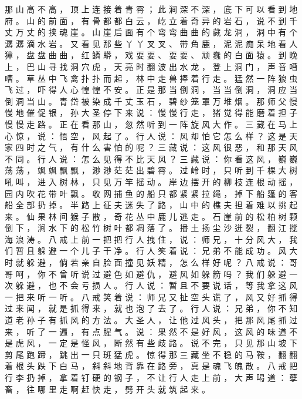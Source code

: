 {那 山 高 不 高 ， 顶 上 连 接 着 青 霄 ； 此 涧 深 不 深 ， 底 下 可 以 看 到 地 府 。
山 的 前 面 ， 有 骨 都 都 白 云 ， 屹 立 着 奇 异 的 岩 石 ， 说 不 到 千 丈 万 丈 的 挟 魂 崖 。
山 崖 后 面 有 个 弯 弯 曲 曲 的 藏 龙 洞 ， 洞 中 有 个 潺 潺 滴 水 岩 。
又 看 见 那 些 丫 丫 叉 叉 、 带 角 鹿 ， 泥 泥 痴 呆 地 看 人 獐 ， 盘 盘 曲 曲 ， 红 鳞 蟒 ， 戏 耍 耍 、 耍 耍 、 顽 蠢 的 白 面 猿 。
到 晚 上 ， 巴 山 寻 找 洞 穴 虎 ， 天 亮 时 翻 波 出 水 龙 ， 登 上 洞 门 ， 声 音 嘈 嘈 。
草 丛 中 飞 禽 扑 扑 而 起 ， 林 中 走 兽 捧 着 行 走 。
猛 然 一 阵 狼 虫 飞 过 ， 吓 得 人 心 惶 惶 不 安 。
正 是 那 当 倒 洞 ， 当 当 倒 洞 ， 洞 应 当 倒 洞 当 山 。
青 岱 被 染 成 千 丈 玉 石 ， 碧 纱 笼 罩 万 堆 烟 。
那 师 父 慢 慢 地 催 促 银 ， 孙 大 圣 停 下 来 说 ： 慢 慢 行 走 ， 猪 觉 得 能 磨 着 担 子 慢 慢 走 路 。
正 在 看 那 山 ， 忽 然 听 到 一 阵 旋 风 大 作 。
三 藏 在 马 上 心 惊 ， 说 ： 悟 空 ， 风 起 了 。
行 人 说 ： 风 却 怕 它 怎 么 样 ？ 这 是 天 家 四 时 之 气 ， 有 什 么 害 怕 的 呢 ？ 三 藏 说 ： 这 风 很 恶 ， 和 那 天 风 不 同 。
行 人 说 ： 怎 么 见 得 不 比 天 风 ？ 三 藏 说 ： 你 看 这 风 ， 巍 巍 荡 荡 ， 飒 飒 飘 飘 ， 渺 渺 茫 茫 出 碧 霄 。
过 岭 时 ， 只 听 到 千 棵 大 树 吼 叫 ， 进 入 树 林 ， 只 见 万 竿 摇 动 。
岸 边 摆 开 的 柳 枝 连 根 动 摇 ， 园 内 吹 花 带 叶 飘 。
收 网 捕 鱼 的 船 只 都 紧 紧 拉 绳 ， 掉 下 船 篷 的 客 船 全 部 扔 掉 。
半 路 上 征 夫 迷 失 了 路 ， 山 中 的 樵 夫 担 着 难 以 挑 起 来 。
仙 果 林 间 猴 子 散 ， 奇 花 丛 中 鹿 儿 逃 走 。
石 崖 前 的 松 柏 树 颗 倒 下 ， 涧 水 下 的 松 竹 树 叶 都 凋 落 了 。
播 土 扬 尘 沙 迸 裂 ， 翻 江 搅 海 浪 涛 。
八 戒 上 前 一 把 把 行 人 拽 住 ， 说 ： 师 兄 ， 十 分 风 大 ， 我 们 暂 且 躲 避 一 个 儿 子 干 净 。
行 人 笑 着 说 ： 兄 弟 不 能 成 功 。
风 大 时 就 躲 避 ， 倘 若 亲 自 脸 面 撞 见 妖 精 ， 怎 么 样 好 呢 ？ 八 戒 说 ： 哥 哥 呵 ， 你 不 曾 听 说 过 避 色 如 避 仇 ， 避 风 如 躲 箭 吗 ？ 我 们 躲 避 一 次 躲 避 ， 也 不 会 亏 损 人 。
行 人 说 ： 暂 且 不 要 说 话 ， 等 我 拿 这 风 一 把 来 听 一 听 。
八 戒 笑 着 说 ： 师 兄 又 扯 空 头 谎 了 ， 风 又 好 抓 得 过 来 闻 ， 就 是 抓 得 来 ， 就 也 泡 了 去 了 。
行 人 说 ： 兄 弟 ， 你 不 知 道 老 孙 子 有 抓 风 的 方 法 。
大 圣 人 ， 让 他 过 风 头 ， 把 那 风 尾 抓 过 来 ， 听 了 一 遍 ， 有 点 腥 气 。
说 ： 果 然 不 是 好 风 ， 这 风 的 味 道 不 是 虎 风 ， 一 定 是 怪 风 ， 断 然 有 些 歧 路 。
说 不 完 ， 只 见 那 山 坡 下 剪 尾 跑 蹄 ， 跳 出 一 只 斑 猛 虎 。
惊 得 那 三 藏 坐 不 稳 的 马 鞍 ， 翻 翻 着 根 头 跌 下 白 马 ， 斜 斜 地 背 靠 在 路 旁 ， 真 是 魂 飞 魄 散 。
八 戒 把 行 李 扔 掉 ， 拿 着 钉 硬 的 钢 子 ， 不 让 行 人 走 上 前 ， 大 声 喝 道 ： 孽 畜 ， 往 哪 里 走 啊 赶 快 走 ， 劈 开 头 就 筑 起 来 。
}
